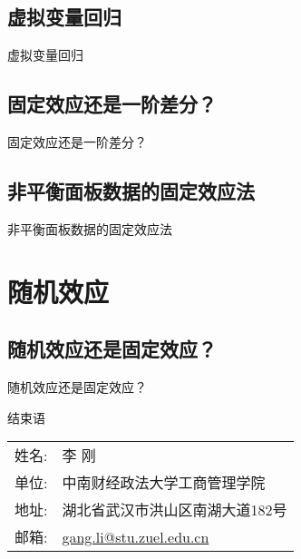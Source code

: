\documentclass[UTF8]{ctexbeamer}
\begin{document}
\subsection{虚拟变量回归}
\begin{frame}{虚拟变量回归}
\end{frame}

\subsection{固定效应还是一阶差分？}
\begin{frame}{固定效应还是一阶差分？}
\end{frame}

\subsection{非平衡面板数据的固定效应法}
\begin{frame}{非平衡面板数据的固定效应法}
\end{frame}



\section{随机效应}
\subsection{随机效应还是固定效应？}
\begin{frame}{随机效应还是固定效应？}
\end{frame}


\begin{frame}{结束语}
\linespread{1.25}
\begin{center}
\vspace{5mm}\large
\begin{tabular}{ll}
{\sc 姓名}:  & \textsf{李 刚}\\
{\sc 单位}: & 中南财经政法大学工商管理学院 \\
{\sc 地址}: & 湖北省武汉市洪山区南湖大道182号 \\
{\sc 邮箱}: & \href{mailto:gang.li@stu.zuel.edu.cn}{\color{blue}gang.li@stu.zuel.edu.cn}\\
\end{tabular}
\end{center}
\end{frame}
\end{document}
